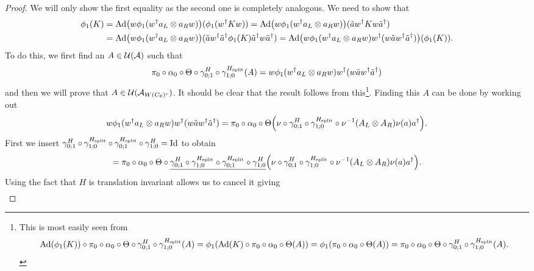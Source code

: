\documentclass[11pt,a4paper,twoside]{article}
\numberwithin{equation}{section}
\begin{document}
	\begin{proof}
		We will only show the first equality as the second one is completely analogous. We need to show that
		\begin{align}
			\phi_1(K)&=\Ad{w\phi_1(w^\dagger a_L\otimes a_R w)}(\phi_1(w^\dagger K w))=\Ad{w\phi_1(w^\dagger a_L\otimes a_R w)}(\tilde{a}w^\dagger K w\tilde{a}^\dagger)\\
			\nonumber
			&=\Ad{w\phi_1(w^\dagger a_L\otimes a_R w)}(\tilde{a}w^\dagger \tilde{a}^\dagger \phi_1(K) \tilde{a}^\dagger w\tilde{a}^\dagger)=\Ad{w\phi_1(w^\dagger a_L\otimes a_R w)w^\dagger (w \tilde{a}w^\dagger \tilde{a}^\dagger)}(\phi_1(K)).
		\end{align}
		To do this, we first find an $A\in\mathcal U(\mathcal A)$ such that
		\begin{equation}
			\pi_0\circ\alpha_0\circ\Theta\circ\gamma^H_{0;1}\circ\gamma^{{H_{\text{split}}}}_{1;0}(A)=w\phi_1(w^\dagger a_L\otimes a_R w)w^\dagger (w \tilde{a}w^\dagger \tilde{a}^\dagger)
		\end{equation}
		and then we will prove that $A\in\mathcal U(\mathcal A_{W(C_\theta)^c})$. It should be clear that the result follows from this\footnote{This is most easily seen from\begin{equation}\Ad{\phi_1(K)}\circ\pi_0\circ\alpha_0\circ\Theta\circ\gamma^H_{0;1}\circ\gamma^{\Hsplit}_{1;0}(A)=\phi_1(\Ad{K}\circ\pi_0\circ\alpha_0\circ\Theta(A))=\phi_1(\pi_0\circ\alpha_0\circ\Theta(A))=\pi_0\circ\alpha_0\circ\Theta\circ\gamma^H_{0;1}\circ\gamma^{\Hsplit}_{1;0}(A). \end{equation}}. Finding this $A$ can be done by working out
		\begin{equation}
			w\phi_1(w^\dagger a_L\otimes a_R w)w^\dagger (w \tilde{a}w^\dagger \tilde{a}^\dagger)=\pi_0\circ\alpha_0\circ\Theta\left(\nu\circ\gamma^H_{0;1}\circ\gamma^{\Hsplit}_{1;0}\circ\nu^{-1}(A_L\otimes A_R)\nu(a)a^\dagger\right).
		\end{equation}
		First we insert $\gamma^H_{0;1}\circ\gamma^{{H_{\text{split}}}}_{1;0}\circ\gamma^{{H_{\text{split}}}}_{0;1}\circ\gamma^H_{1;0}=\text{Id}$ to obtain
		\begin{equation}
			=\pi_0\circ\alpha_0\circ\Theta\circ\underline{\gamma^H_{0;1}\circ\gamma^{\Hsplit}_{1;0}\circ\gamma^{\Hsplit}_{0;1}\circ\gamma^H_{1;0}}\left(\nu\circ\gamma^H_{0;1}\circ\gamma^{\Hsplit}_{1;0}\circ\nu^{-1}(A_L\otimes A_R)\nu(a)a^\dagger\right).
		\end{equation}
		Using the fact that $H$ is translation invariant allows us to cancel it giving
		\begin{align}

\end{align}
\end{proof}
\end{document}
